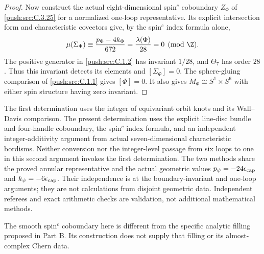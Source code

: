 \begin{proof}
Now construct the actual eight-dimensional spin$^c$ coboundary
$Z_\Phi$ of \ref{push:src:C.3.25} for a normalized one-loop representative.
Its explicit intersection form and characteristic covectors
give, by the spin$^c$ index formula alone,
\[
 \mu(\Sigma_\Phi)
   \equiv\frac{p_\Phi-4k_\Phi}{672}
   =\frac{\lambda(\Phi)}{28}=0\pmod\Z.
\]
The positive generator in \ref{push:src:C.1.2} has invariant $1/28$, and
$\Theta_7$ has order $28$. Thus this invariant detects its
elements and $[\Sigma_\Phi]=0$. The sphere-gluing comparison
of \ref{push:src:C.1.1} gives $[\Phi]=0$. It also gives
$M_\Phi\cong S^1\times S^6$ with either spin structure having
zero invariant.
\end{proof}

\begin{remark}
The first determination uses the integer of equivariant
orbit knots and its Wall--Davis comparison. The present
determination uses the explicit line-disc bundle and
four-handle coboundary, the spin$^c$ index formula, and an
independent integer-additivity argument from actual
seven-dimensional characteristic bordisms. Neither conversion
nor the integer-level passage from six loops to one in this
second argument invokes the first determination. The two
methods share the proved annular representative and the actual
geometric values $p_\psi=-24\epsilon_{\rm cap}$ and
$k_\psi=-6\epsilon_{\rm cap}$. Their independence is at the
boundary-invariant and one-loop arguments; they are not
calculations from disjoint geometric data. Independent
referees and exact arithmetic checks are validation, not
additional mathematical methods.

The smooth spin$^c$ coboundary here is different from the
specific analytic filling proposed in Part B. Its construction
does not supply that filling or its almost-complex Chern data.
\end{remark}
